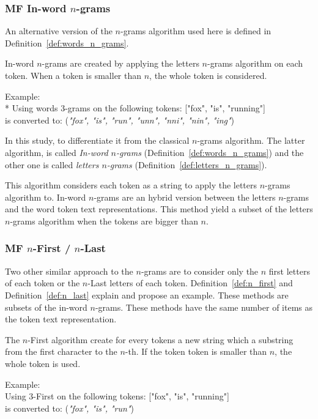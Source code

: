 \subsubsection{MF In-word $n$-grams}

An alternative version of the $n$-grams algorithm used here is defined in Definition~\ref{def:words_n_grams}.

\begin{definition}
  In-word $n$-grams are created by applying the letters $n$-grams algorithm on each token.
  When a token is smaller than $n$, the whole token is considered.

  Example: \\*
  Using words 3-grams on the following tokens: ["fox", "is", "running"] \\
  is converted to: (\textit{"fox", "is", "run", "unn", "nni", "nin", "ing"})
\end{definition}

In this study, to differentiate it from the classical $n$-grams algorithm.
The latter algorithm, is called \textit{In-word $n$-grams} (Definition~\ref{def:words_n_grams}) and the other one is called \textit{letters $n$-grams} (Definition~\ref{def:letters_n_grams}).

This algorithm considers each token as a string to apply the letters $n$-grams algorithm to.
In-word $n$-grams are an hybrid version between the letters $n$-grams and the word token text representations.
This method yield a subset of the letters $n$-grams algorithm when the tokens are bigger than $n$.

\subsubsection{MF $n$-First / $n$-Last}

Two other similar approach to the $n$-grams are to consider only the $n$ first letters of each token or the $n$-Last letters of each token.
Definition~\ref{def:n_first} and Definition~\ref{def:n_last} explain and propose an example.
These methods are subsets of the in-word $n$-grams.
These methods have the same number of items as the token text representation.

\begin{definition}
  The $n$-First algorithm create for every tokens a new string which a substring from the first character to the $n$-th.
  If the token token is smaller than $n$, the whole token is used.

  Example: \\
  Using $3$-First on the following tokens: ["fox", "is", "running"] \\
  is converted to: (\textit{"fox", "is", "run"})
\end{definition}

